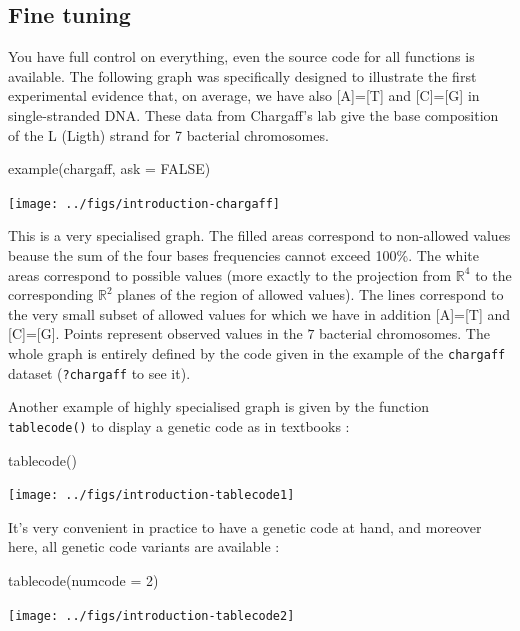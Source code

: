 \documentclass{article}
\begin{document}
\subsection{Fine tuning} 
You have full control on everything, even the source code
for all functions is available. 
The following graph was specifically designed to illustrate
the first experimental evidence \cite{chargaff} that, on average, we have also [A]=[T] and [C]=[G] 
in single-stranded DNA. These data from Chargaff's lab give the base composition of the L (Ligth) 
strand for 7 bacterial chromosomes.

\begin{Schunk}
\begin{Sinput}
 example(chargaff, ask = FALSE)
\end{Sinput}
\end{Schunk}
\texttt{[image: ../figs/introduction-chargaff]}
\medskip

This is a very specialised graph. The filled areas correspond to non-allowed values beause the sum 
of the four bases frequencies cannot exceed 100\%. The white areas correspond to possible values 
(more exactly to the projection from $\mathbb{R}^4$ to the corresponding $\mathbb{R}^2$ 
planes of the region of allowed values). The lines correspond to the very small subset of allowed 
values for which we have in addition [A]=[T] and [C]=[G]. Points represent observed values in
the $7$ bacterial chromosomes. The whole graph is entirely defined by the code given in the
example of the \texttt{chargaff} dataset (\texttt{?chargaff} to see it).

Another example of highly specialised graph is given by the function \texttt{tablecode()} to
display a genetic code as in textbooks :

\begin{Schunk}
\begin{Sinput}
 tablecode()
\end{Sinput}
\end{Schunk}
\texttt{[image: ../figs/introduction-tablecode1]}

It's very convenient in practice to have a genetic code at hand, and moreover here,
all genetic code variants are available :

\begin{Schunk}
\begin{Sinput}
 tablecode(numcode = 2)
\end{Sinput}
\end{Schunk}
\texttt{[image: ../figs/introduction-tablecode2]}
\end{document}
